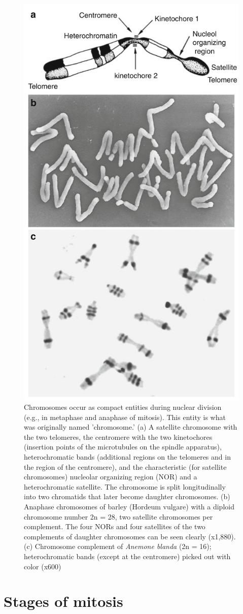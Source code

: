\documentclass[11pt,ignorenonframetext,aspectratio=169]{beamer}
\begin{document}
\begin{frame}{}
\protect\hypertarget{section-7}{}
\begin{figure}
\includegraphics[width=0.25\linewidth]{../images/chromosome_structure} \caption{Chromosomes occur as compact entities during nuclear division (e.g., in metaphase and anaphase of mitosis). This entity is what was originally named 'chromosome.' (a) A satellite chromosome with the two telomeres, the centromere with the two kinetochores (insertion points of the microtubules on the spindle apparatus), heterochromatic bands (additional regions on the telomeres and in the region of the centromere), and the characteristic (for satellite chromosomes) nucleolar organizing region (NOR) and a heterochromatic satellite. The chromosome is split longitudinally into two chromatids that later become daughter chromosomes. (b) Anaphase chromosomes of barley (Hordeum vulgare) with a diploid chromosome number 2n = 28, two satellite chromosomes per complement. The four NORs and four satellites of the two complements of daughter chromosomes can be seen clearly (x1,880). (c) Chromosome complement of \textit{Anemone blanda} (2n = 16); heterochromatic bands (except at the centromere) picked out with color (x600)}\label{fig:chromosome-structure}
\end{figure}
\end{frame}

\hypertarget{stages-of-mitosis}{%
\section{Stages of mitosis}\label{stages-of-mitosis}}
\end{document}
